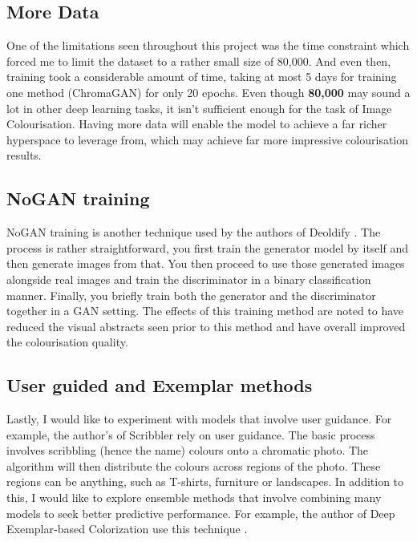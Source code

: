 \subsection{More Data}
One of the limitations seen throughout this project was the time constraint which forced me to limit the dataset to a rather small size of 80,000. And even then, training took a considerable amount of time, taking at most 5 days for training one method (ChromaGAN) for only 20 epochs. Even though \textbf{80,000} may sound a lot in other deep learning tasks, it isn't sufficient enough for the task of Image Colourisation. Having more data will enable the model to achieve a far richer hyperspace to leverage from, which may achieve far more impressive colourisation results.

\subsection{NoGAN training}
NoGAN training is another technique used by the authors of Deoldify \cite{nogan2020}. The process is rather straightforward, you first train the generator model by itself and then generate images from that. You then proceed to use those generated images alongside real images and train the discriminator in a binary classification manner. Finally, you briefly train both the generator and the discriminator together in a GAN setting. The effects of this training method are noted to have reduced the visual abstracts seen prior to this method and have overall improved the colourisation quality. 

\subsection{User guided and Exemplar methods}
Lastly, I would like to experiment with models that involve user guidance. For example, the author's of Scribbler rely on user guidance. The basic process involves scribbling (hence the name) colours onto a chromatic photo. The algorithm will then distribute the colours across regions of the photo. These regions can be anything, such as T-shirts, furniture or landscapes. In addition to this, I would like to explore ensemble methods that involve combining many models to seek better predictive performance. For example, the author of Deep Exemplar-based Colorization use this technique \cite{DBLP:journals/corr/abs-1807-06587}. 

